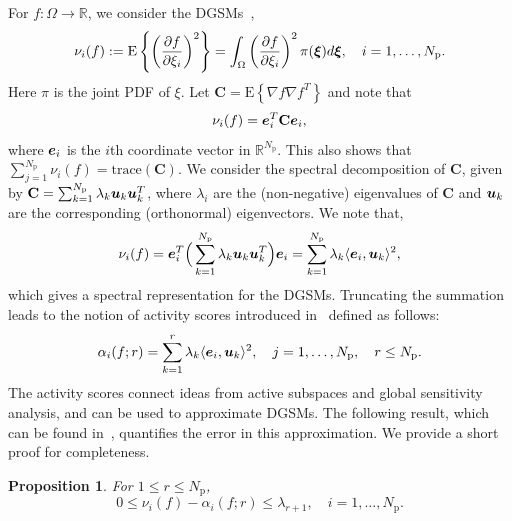 \documentclass[11pt]{article}
\renewcommand{\vec}[1]{{\mathchoice
                     {\mbox{\boldmath$\displaystyle{#1}$}}
                     {\mbox{\boldmath$\textstyle{#1}$}}
                     {\mbox{\boldmath$\scriptstyle{#1}$}}
                     {\mbox{\boldmath$\scriptscriptstyle{#1}$}}}}
\newcommand{\R}{\mathbb{R}}
\newcommand{\ip}[2]{\langle{#1}, {#2}\rangle}
\newcommand{\trace}{\mathrm{trace}}
\newcommand{\mat}[1]{\mathbf{{#1}}}
\newcommand{\Np}{{N_\text{p}}}
\newcommand{\E}[1]{\mathrm{E}\left\{{#1} \right\}}
\newtheorem{proposition}{Proposition}[section]
\begin{document}
For $f: \Omega \to \R$, we consider the DGSMs~\cite{SobolKucherenko09},
\[
    \nu_i(f) := \E{\left(\frac{\partial f}{\partial\xi_i}\right)^2} =
                  \int_\Omega 
                  \left(\frac{\partial f}{\partial\xi_i}\right)^2
                  \pi(\vec{\xi})d\vec{\xi}, \quad i = 1, \ldots, \Np.   
\]
Here $\pi$ is the joint PDF of $\xi$. 
Let $\mat{C} = \E{\nabla f \nabla f^T}$ and note that
\[
   \nu_i(f) = \vec{e}_i^T \mat{C} \vec{e}_i, 
\]
where $\vec{e}_i$ is the $i$th coordinate vector in $\R^\Np$.
This also shows that $\sum_{j=1}^\Np \nu_i(f) = \trace(\mat{C})$.
We consider the spectral decomposition of $\mat{C}$, given by  
$\mat{C} = \sum_{k=1}^\Np \lambda_k \vec{u}_k \vec{u}_k^T$, where 
$\lambda_i$ are the (non-negative) eigenvalues of $\mat{C}$ and
$\vec{u}_k$ are the corresponding (orthonormal) eigenvectors.
We note that,
\begin{equation}\label{equ:spectral_DGSM}
\nu_i(f) = \vec{e}_i^T \Big(\sum_{k=1}^\Np \lambda_k \vec{u}_k \vec{u}_k^T\Big) \vec{e}_i
 = \sum_{k=1}^\Np \lambda_k \ip{\vec{e}_i}{\vec{u}_k}^2, 
\end{equation}
which gives a spectral representation for the DGSMs. Truncating the summation 
leads to the notion of activity scores introduced in~\cite{Diaz16,ConstantineDiaz17}
defined as follows: 
\[
   \alpha_i(f; r) =  \sum_{k=1}^r \lambda_k \ip{\vec{e}_i}{\vec{u}_k}^2,
   \quad j = 1, \ldots, \Np, \quad r \leq \Np.
\]
The activity scores connect ideas from active subspaces and global sensitivity
analysis, and can be used to approximate DGSMs.  The following result, which
can be found in~\cite{Diaz16,ConstantineDiaz17}, quantifies the error in this
approximation. We provide a short proof for completeness. 
\begin{proposition}\label{prp:dgsm_bound} 
For $1 \leq r \leq \Np$,
\[
0 \leq \nu_i(f) - \alpha_i(f; r) \leq \lambda_{r+1}, \quad i = 1, \ldots, \Np.
\] 
\end{proposition}
\end{document}

